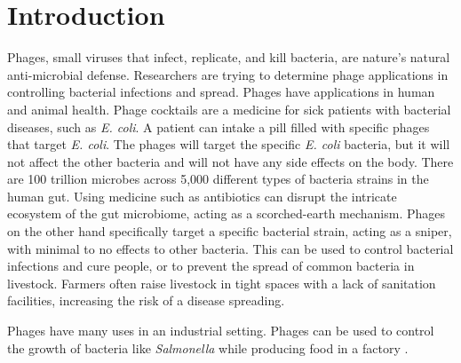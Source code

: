 \chapter{Introduction}
\label{Introduction}

Phages, small viruses that infect, replicate, and kill bacteria, are nature's natural anti-microbial defense. 
Researchers are trying to determine phage applications in controlling bacterial infections and spread. 
Phages have applications in human and animal health. 
Phage cocktails are a medicine for sick patients with bacterial diseases, such as \textit{E. coli}. 
A patient can intake a pill filled with specific phages that target \textit{E. coli}.
The phages will target the specific \textit{E. coli} bacteria, but it will not affect the other bacteria and will not have any side effects on the body. 
There are 100 trillion microbes across 5,000 different types of bacteria strains in the human gut. 
Using medicine such as antibiotics can disrupt the intricate ecosystem of the gut microbiome, acting as a scorched-earth mechanism. 
Phages on the other hand specifically target a specific bacterial strain, acting as a sniper, with minimal to no effects to other bacteria. 
This can be used to control bacterial infections and cure people, or to prevent the spread of common bacteria in livestock. 
Farmers often raise livestock in tight spaces with a lack of sanitation facilities, increasing the risk of a disease spreading. \newline 

Phages have many uses in an industrial setting. 
Phages can be used to control the growth of bacteria like \textit{Salmonella} while producing food in a factory \cite{sofferBacteriophagesSafelyReduce2016, kowalskaFreshVegetablesFruit2023}. 

